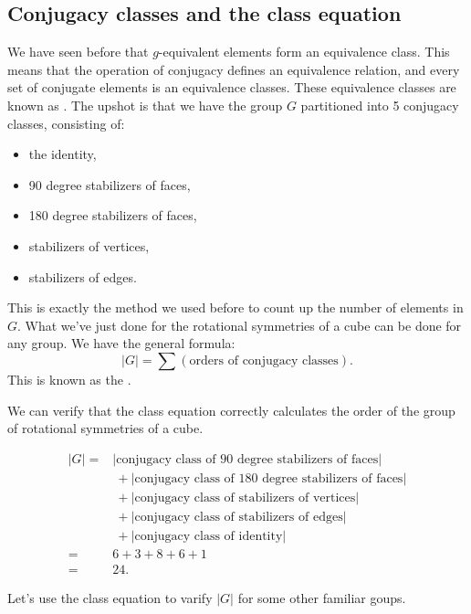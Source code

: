 \subsection*{Conjugacy classes and the class equation}

We have seen before that $g$-equivalent elements form an equivalence class. This means that the operation of conjugacy defines an equivalence relation, and every set of conjugate elements is an equivalence classes. These equivalence classes are known as .
The upshot is that we have the group $G$ partitioned into 5 conjugacy classes, consisting of: 
\begin{itemize}
\item
the identity, 
\item
90 degree stabilizers of faces, 
\item
180 degree stabilizers of faces, 
\item
stabilizers of vertices, 
\item
stabilizers of edges. 
\end{itemize}

This is exactly the method we used before to count up the number of elements in $G$.  
What we've just done for the rotational symmetries of a cube can be done for any group.  We have the general formula:
$$|G| = \sum (\text{orders of conjugacy classes}).$$
This is known as the .

\begin{example}\label{example:actions:Conj15}
  We can verify that the class equation correctly calculates the order of the group of rotational symmetries of a cube. 

\begin{align*}
|G|=&|\text{conjugacy class of 90 degree stabilizers of faces}| \\
&~+|\text{conjugacy class of 180 degree stabilizers of faces}|\\
&~+|\text{conjugacy class of stabilizers of vertices}|\\
&~+|\text{conjugacy class of stabilizers of edges}|\\
&~+|\text{conjugacy class of identity}|\\
=&6+3+8+6+1\\
=&24.
\end{align*}
\end{example}

Let's use the class equation to varify $|G|$ for some other familiar goups.  

